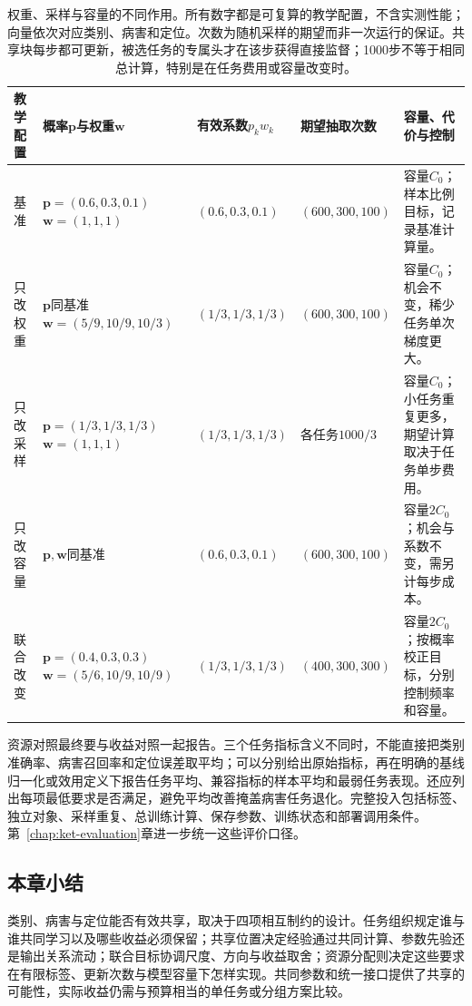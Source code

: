 \begin{table}[htbp]
  \centering
  \small
  \begin{tabularx}{\linewidth}{p{18mm}p{36mm}p{25mm}p{28mm}X}
    \toprule
    教学配置 & 概率$\bm p$与权重$\bm w$ & 有效系数$p_kw_k$ & 期望抽取次数 & 容量、代价与控制 \\
    \midrule
    基准 &
    $\bm p=(0.6,0.3,0.1)$\newline
    $\bm w=(1,1,1)$ &
    $(0.6,0.3,0.1)$ &
    $(600,300,100)$ &
    容量$C_0$；样本比例目标，记录基准计算量。 \\
    只改权重 &
    $\bm p$同基准\newline
    $\bm w=(5/9,10/9,10/3)$ &
    $(1/3,1/3,1/3)$ &
    $(600,300,100)$ &
    容量$C_0$；机会不变，稀少任务单次梯度更大。 \\
    只改采样 &
    $\bm p=(1/3,1/3,1/3)$\newline
    $\bm w=(1,1,1)$ &
    $(1/3,1/3,1/3)$ &
    各任务$1000/3$ &
    容量$C_0$；小任务重复更多，期望计算取决于任务单步费用。 \\
    只改容量 &
    $\bm p,\bm w$同基准 &
    $(0.6,0.3,0.1)$ &
    $(600,300,100)$ &
    容量$2C_0$；机会与系数不变，需另计每步成本。 \\
    联合改变 &
    $\bm p=(0.4,0.3,0.3)$\newline
    $\bm w=(5/6,10/9,10/9)$ &
    $(1/3,1/3,1/3)$ &
    $(400,300,300)$ &
    容量$2C_0$；按概率校正目标，分别控制频率和容量。 \\
    \bottomrule
  \end{tabularx}
  \caption{权重、采样与容量的不同作用。所有数字都是可复算的教学配置，不含实测性能；向量依次对应类别、病害和定位。次数为随机采样的期望而非一次运行的保证。共享块每步都可更新，被选任务的专属头才在该步获得直接监督；1000步不等于相同总计算，特别是在任务费用或容量改变时。}
  \label{tab:ket-sharing-resource-controls}
\end{table}

资源对照最终要与收益对照一起报告。三个任务指标含义不同时，不能直接把类别准确率、病害召回率和定位误差取平均；可以分别给出原始指标，再在明确的基线归一化或效用定义下报告任务平均、兼容指标的样本平均和最弱任务表现。还应列出每项最低要求是否满足，避免平均改善掩盖病害任务退化。完整投入包括标签、独立对象、采样重复、总训练计算、保存参数、训练状态和部署调用条件。第~\ref{chap:ket-evaluation}章进一步统一这些评价口径。

\begin{samepage}
\section{本章小结}
\label{sec:ket-sharing-summary}

类别、病害与定位能否有效共享，取决于四项相互制约的设计。任务组织规定谁与谁共同学习以及哪些收益必须保留；共享位置决定经验通过共同计算、参数先验还是输出关系流动；联合目标协调尺度、方向与收益取舍；资源分配则决定这些要求在有限标签、更新次数与模型容量下怎样实现。共同参数和统一接口提供了共享的可能性，实际收益仍需与预算相当的单任务或分组方案比较。

\end{samepage}

